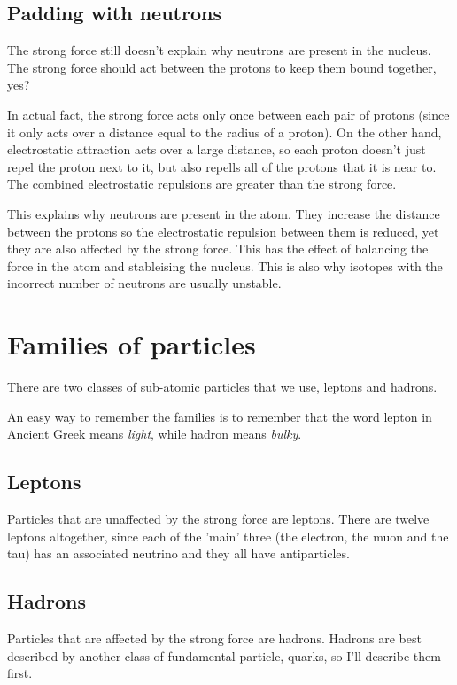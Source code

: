 \documentclass{article}
\begin{document}
\subsection*{Padding with neutrons}

The strong force still doesn't explain why neutrons are present in the nucleus.
The strong force should act between the protons to keep them bound together,
yes?

In actual fact, the strong force acts only once between each pair of protons
(since it only acts over a distance equal to the radius of a proton). On the
other hand, electrostatic attraction acts over a large distance, so each proton
doesn't just repel the proton next to it, but also repells all of the protons
that it is near to. The combined electrostatic repulsions are greater than the
strong force.

This explains why neutrons are present in the atom. They increase the distance
between the protons so the electrostatic repulsion between them is reduced, yet
they are also affected by the strong force. This has the effect of balancing the
force in the atom and stableising the nucleus. This is also why isotopes with
the incorrect number of neutrons are usually unstable.

\section*{Families of particles}

There are two classes of sub-atomic particles that we use, leptons and hadrons.

An easy way to remember the families is to remember that the word lepton in
Ancient Greek means {\it light}, while hadron means {\it bulky}.

\subsection*{Leptons}

Particles that are unaffected by the strong force are leptons. There are twelve
leptons altogether, since each of the 'main' three (the electron, the muon and
the tau) has an associated neutrino and they all have antiparticles.

\subsection*{Hadrons}

Particles that are affected by the strong force are hadrons. Hadrons are best described by another class of fundamental particle, quarks, so I'll describe them first.
\end{document}
